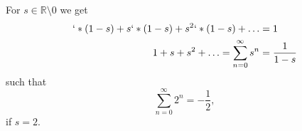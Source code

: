 \documentclass{article}
\begin{document}
For \(s \in \mathbb{R} \setminus 0 \) we get
\begin{align*}
    `*(1-s) + s`*(1-s) + s^2`*(1-s) + \ldots     & = 1             \\
    1 + s + s^2 + \ldots = \sum_{n=0}^\infty s^n & = \frac{1}{1-s}
\end{align*}
such that
\begin{equation}
    \sum_{n=0}^\infty 2^n = -\frac{1}{2},
\end{equation}
if \(s = 2\).
\end{document}
